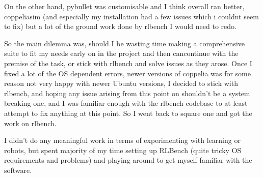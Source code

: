 On the other hand, pybullet was customisable and I think overall ran better, coppeliasim (and especially my installation had a few issues which i couldnt seem to fix) but a lot of the ground work done by rlbench I would need to redo. 

So the main dilemma was, should I be wasting time making a comprehensive suite to fit my needs early on in the project and then cancontinue with the premise of the task, or stick with rlbench and solve issues as they arose. Once I fixed a lot of the OS dependent errors, newer versions of coppelia was for some reason not very happy with newer Ubuntu versions, I decided to stick with rlbench, and hoping any issue arising from this point on shouldn't be a system breaking one, and I was familiar enough with the rlbench codebase to at least attempt to fix anything at this point. So I went back to square one and got the work on rlbench.



I didn't do any meaningful work in terms of experimenting with learning or robots, but spent majority of my time setting up RLBench (quite tricky OS requirements and problems) and playing around to get myself familiar with the software.